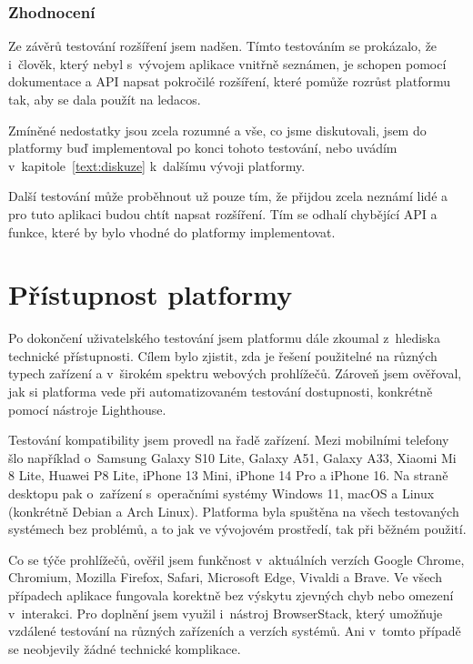 \subsubsection{Zhodnocení}

Ze závěrů testování rozšíření jsem nadšen.
Tímto testováním se prokázalo, že i~člověk, který nebyl s~vývojem aplikace vnitřně seznámen, je schopen pomocí dokumentace a API napsat pokročilé rozšíření, které pomůže rozrůst platformu tak, aby se dala použít na ledacos.

Zmíněné nedostatky jsou zcela rozumné a vše, co jsme diskutovali, jsem do platformy buď implementoval po konci tohoto testování, nebo uvádím v~kapitole~\ref{text:diskuze} k~dalšímu vývoji platformy.

Další testování může proběhnout už pouze tím, že přijdou zcela neznámí lidé a pro tuto aplikaci budou chtít napsat rozšíření.
Tím se odhalí chybějící API a funkce, které by bylo vhodné do platformy implementovat.


\section{Přístupnost platformy}

Po dokončení uživatelského testování jsem platformu dále zkoumal z~hlediska technické přístupnosti. 
Cílem bylo zjistit, zda je řešení použitelné na různých typech zařízení a v~širokém spektru webových prohlížečů. 
Zároveň jsem ověřoval, jak si platforma vede při automatizovaném testování dostupnosti, konkrétně pomocí nástroje Lighthouse.

Testování kompatibility jsem provedl na řadě zařízení. 
Mezi mobilními telefony šlo například o~Samsung Galaxy S10 Lite, Galaxy A51, Galaxy A33, Xiaomi Mi 8 Lite, Huawei P8 Lite, iPhone 13 Mini, iPhone 14 Pro a iPhone 16. 
Na straně desktopu pak o~zařízení s~operačními systémy Windows 11, macOS a Linux (konkrétně Debian a Arch Linux). 
Platforma byla spuštěna na všech testovaných systémech bez problémů, a to jak ve vývojovém prostředí, tak při běžném použití.

Co se týče prohlížečů, ověřil jsem funkčnost v~aktuálních verzích Google Chrome, Chromium, Mozilla Firefox, Safari, Microsoft Edge, Vivaldi a Brave. 
Ve všech případech aplikace fungovala korektně bez výskytu zjevných chyb nebo omezení v~interakci. 
Pro doplnění jsem využil i~nástroj BrowserStack, který umožňuje vzdálené testování na různých zařízeních a verzích systémů. Ani v~tomto případě se neobjevily žádné technické komplikace.

